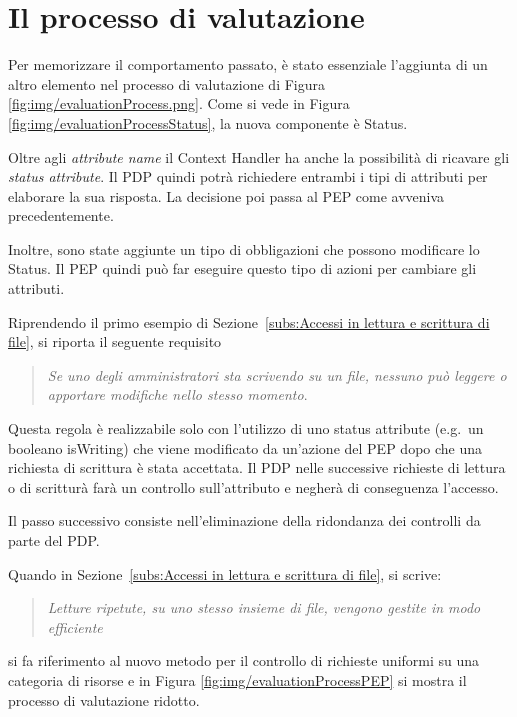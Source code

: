 \section{Il processo di valutazione}
\label{sec:Il processo di valutazione Facpl new}
Per memorizzare il comportamento passato, è stato essenziale l'aggiunta di un altro elemento
nel processo di valutazione di Figura \ref{fig:img/evaluationProcess.png}.
Come si vede in Figura \ref{fig:img/evaluationProcessStatus}, la nuova componente è Status.\par
{}
Oltre agli \emph{attribute name} il Context Handler ha anche la possibilità di ricavare gli \emph{status attribute}.
Il \ac{PDP} quindi potrà richiedere entrambi i tipi di attributi per elaborare la sua risposta. La decisione poi passa al PEP
come avveniva precedentemente.\par
Inoltre, sono state aggiunte un tipo di obbligazioni che possono modificare lo Status. Il \ac{PEP} quindi può far eseguire questo tipo di
azioni per cambiare gli attributi.\par
Riprendendo il primo esempio di Sezione~\ref{subs:Accessi in lettura e scrittura di file}, si riporta il seguente requisito
\begin{quote}
\emph{Se uno degli amministratori sta scrivendo su un file, nessuno può leggere o apportare modifiche nello stesso momento}.
\end{quote}
Questa regola è realizzabile
solo con l'utilizzo di uno status attribute (e.g.\ un booleano isWriting) che viene modificato da un'azione del PEP dopo che
una richiesta di scrittura è stata accettata. Il \ac{PDP} nelle successive richieste di lettura o di scritturà farà un controllo
sull'attributo e negherà di conseguenza l'accesso.\par
{}
Il passo successivo consiste nell'eliminazione della ridondanza dei controlli da parte del \ac{PDP}.\par
Quando in Sezione~\ref{subs:Accessi in lettura e scrittura di file}, si scrive:
\begin{quote}
  \emph{Letture ripetute, su uno stesso insieme di file, vengono gestite in modo efficiente}
\end{quote}
si fa riferimento al nuovo metodo per il controllo di richieste uniformi su una categoria di risorse e
in Figura \ref{fig:img/evaluationProcessPEP} si mostra il processo di valutazione ridotto.\par
